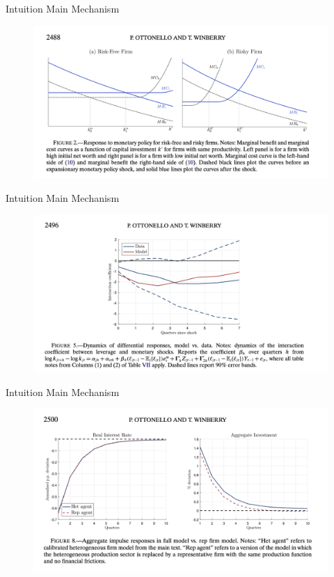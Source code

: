 \documentclass[english,xcolor=svgnames,aspectratio=169]{beamer}
\begin{document}
\begin{frame}{Intuition Main Mechanism}
\begin{figure}
\includegraphics[scale=0.45]{figures/ow_7}
\end{figure}
\end{frame}

\begin{frame}{Intuition Main Mechanism}
\begin{figure}
\includegraphics[scale=0.45]{figures/ow_3}
\end{figure}
\end{frame}


\begin{frame}{Intuition Main Mechanism}
\begin{figure}
\includegraphics[scale=0.45]{figures/ow_4}
\end{figure}
\end{frame}
\end{document}
